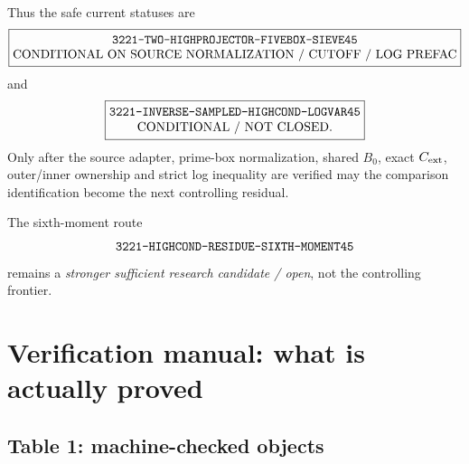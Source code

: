 \documentclass[11pt]{article}
\theoremstyle{definition}
\newcommand{\1}{\mathbf 1}
\begin{document}
Thus the safe current statuses are
\[
\boxed{\begin{gathered}
\text{\ttfamily 3221-TWO-HIGHPROJECTOR-FIVEBOX-SIEVE45}\\[-1mm]
\text{CONDITIONAL ON SOURCE NORMALIZATION / CUTOFF / LOG PREFAC}
\end{gathered}}
\]
and
\[
\boxed{\begin{gathered}
\text{\ttfamily 3221-INVERSE-SAMPLED-HIGHCOND-LOGVAR45}\\[-1mm]
\text{CONDITIONAL / NOT CLOSED}.
\end{gathered}}
\]
Only after the source adapter, prime-box normalization, shared $B_0$, exact $C_{\rm ext}$,
outer/inner ownership and strict log inequality are verified may the comparison
identification become the next controlling residual.

The sixth-moment route
\[
\text{\ttfamily 3221-HIGHCOND-RESIDUE-SIXTH-MOMENT45}
\]
remains a \emph{stronger sufficient research candidate / open}, not the controlling
frontier.


\section{Verification manual: what is actually proved}

\subsection{Table 1: machine-checked objects}
\end{document}

